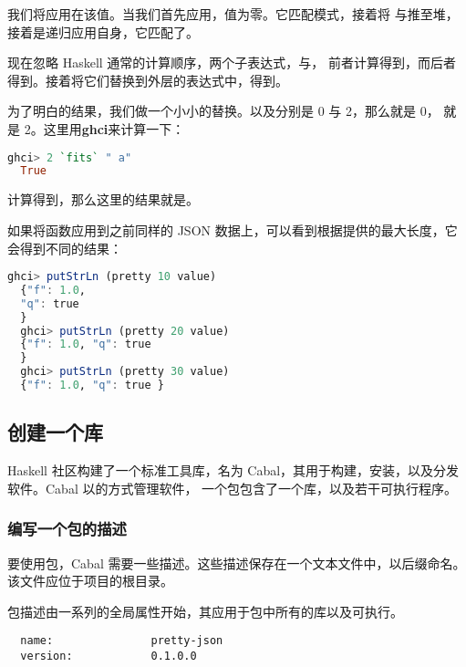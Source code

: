 \documentclass[./main.tex]{subfiles}
\begin{document}
我们将应用在该值。当我们首先应用，值为零。它匹配模式，接着将
与推至堆，接着是递归应用自身，它匹配了。

现在忽略 Haskell 通常的计算顺序，两个子表达式，与，
前者计算得到，而后者得到。接着将它们替换到外层的表达式中，得到。

为了明白的结果，我们做一个小小的替换。以及分别是 0 与 2，那么就是 0，
就是 2。这里用\textbf{ghci}来计算一下：

\begin{lstlisting}[language=Haskell]
  ghci> 2 `fits` " a"
  True
\end{lstlisting}

计算得到，那么这里的结果就是。

如果将函数应用到之前同样的 JSON 数据上，可以看到根据提供的最大长度，它会得到不同的结果：

\begin{lstlisting}[language=Haskell]
  ghci> putStrLn (pretty 10 value)
  {"f": 1.0,
  "q": true
  }
  ghci> putStrLn (pretty 20 value)
  {"f": 1.0, "q": true
  }
  ghci> putStrLn (pretty 30 value)
  {"f": 1.0, "q": true }
\end{lstlisting}

\subsection*{创建一个库}

Haskell 社区构建了一个标准工具库，名为 Cabal，其用于构建，安装，以及分发软件。Cabal 以的方式管理软件，
一个包包含了一个库，以及若干可执行程序。

\subsubsection*{编写一个包的描述}

要使用包，Cabal 需要一些描述。这些描述保存在一个文本文件中，以后缀命名。该文件应位于项目的根目录。

包描述由一系列的全局属性开始，其应用于包中所有的库以及可执行。

\begin{lstlisting}
  name:               pretty-json
  version:            0.1.0.0
\end{lstlisting}
\end{document}
